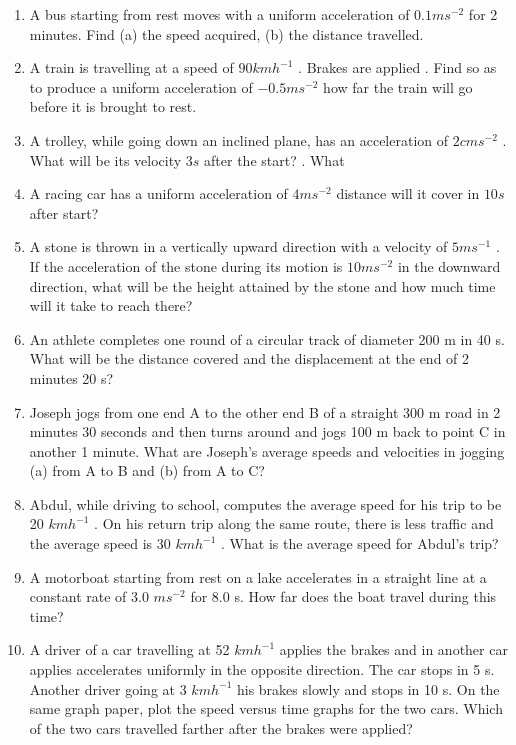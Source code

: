 \renewcommand{\theequation}{\theenumi}
\begin{enumerate}[label=\arabic*.,ref=\thesubsection.\theenumi]

\item A bus starting from rest moves with a uniform acceleration of $0.1 m s^{-2}$
for 2 minutes. Find (a)
the speed acquired, (b) the distance travelled.

\item A train is travelling at a speed of $90 km h^{-1}$
. Brakes are applied . Find
so as to produce a uniform acceleration of $- 0.5 m s^{-2}$
how far the train will go before it is brought to rest.
\item  A trolley, while going down an inclined plane, has an acceleration of $2 cm s^{-2}$
. What will
be its velocity $3 s$ after the start? . What
\item  A racing car has a uniform acceleration of $4 m s^{-2}$
distance will it cover in $10 s$ after start?
\item  A stone is thrown in a vertically upward direction with a velocity of $5 m s^{-1}$
. If the acceleration of the
stone during its motion is $10 m s^{-2}$ in the downward direction, what will be the height attained by the stone and how much time will it take to reach there?

\item An athlete completes one round of a circular track of diameter 200 m in 40 s. What will be the distance covered and the displacement at the end of 2 minutes 20 s?
\item  Joseph jogs from one end A to the other end B of a straight 300 m road in 2 minutes 30 seconds and then turns around
and jogs 100 m back to point C in another 1 minute. What are Joseph’s average speeds and velocities in jogging (a) from A to B and (b) from A to C?
\item  Abdul, while driving to school, computes the average speed for his trip to be 20 $km h^{-1}$
. On his return trip along the same
route, there is less traffic and the average speed is 30 $km h^{-1}$
. What is the average speed for Abdul’s trip?
\item  A motorboat starting from rest on a lake accelerates in a straight line at a constant rate of 3.0 $m s^{-2}$
for 8.0 s. How far does the boat travel during this time? 
\item  A driver of a car travelling at 52 $km h^{-1}$
applies the brakes and in another car applies
accelerates uniformly in the opposite direction. The car stops in 5 s. Another driver going at 3 $km h^{-1}$
his brakes slowly and stops in 10 s. On the same graph paper, plot the speed versus time graphs for the two cars. Which of the two cars travelled farther after the brakes were applied?


\end{enumerate}
